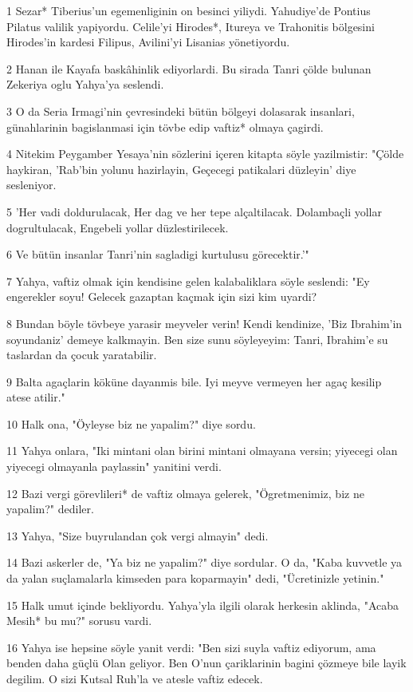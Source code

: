 \par 1 Sezar* Tiberius'un egemenliginin on besinci yiliydi. Yahudiye'de Pontius Pilatus valilik yapiyordu. Celile'yi Hirodes*, Itureya ve Trahonitis bölgesini Hirodes'in kardesi Filipus, Avilini'yi Lisanias yönetiyordu.
\par 2 Hanan ile Kayafa baskâhinlik ediyorlardi. Bu sirada Tanri çölde bulunan Zekeriya oglu Yahya'ya seslendi.
\par 3 O da Seria Irmagi'nin çevresindeki bütün bölgeyi dolasarak insanlari, günahlarinin bagislanmasi için tövbe edip vaftiz* olmaya çagirdi.
\par 4 Nitekim Peygamber Yesaya'nin sözlerini içeren kitapta söyle yazilmistir: "Çölde haykiran, 'Rab'bin yolunu hazirlayin, Geçecegi patikalari düzleyin' diye sesleniyor.
\par 5 'Her vadi doldurulacak, Her dag ve her tepe alçaltilacak. Dolambaçli yollar dogrultulacak, Engebeli yollar düzlestirilecek.
\par 6 Ve bütün insanlar Tanri'nin sagladigi kurtulusu görecektir.'"
\par 7 Yahya, vaftiz olmak için kendisine gelen kalabaliklara söyle seslendi: "Ey engerekler soyu! Gelecek gazaptan kaçmak için sizi kim uyardi?
\par 8 Bundan böyle tövbeye yarasir meyveler verin! Kendi kendinize, 'Biz Ibrahim'in soyundaniz' demeye kalkmayin. Ben size sunu söyleyeyim: Tanri, Ibrahim'e su taslardan da çocuk yaratabilir.
\par 9 Balta agaçlarin köküne dayanmis bile. Iyi meyve vermeyen her agaç kesilip atese atilir."
\par 10 Halk ona, "Öyleyse biz ne yapalim?" diye sordu.
\par 11 Yahya onlara, "Iki mintani olan birini mintani olmayana versin; yiyecegi olan yiyecegi olmayanla paylassin" yanitini verdi.
\par 12 Bazi vergi görevlileri* de vaftiz olmaya gelerek, "Ögretmenimiz, biz ne yapalim?" dediler.
\par 13 Yahya, "Size buyrulandan çok vergi almayin" dedi.
\par 14 Bazi askerler de, "Ya biz ne yapalim?" diye sordular. O da, "Kaba kuvvetle ya da yalan suçlamalarla kimseden para koparmayin" dedi, "Ücretinizle yetinin."
\par 15 Halk umut içinde bekliyordu. Yahya'yla ilgili olarak herkesin aklinda, "Acaba Mesih* bu mu?" sorusu vardi.
\par 16 Yahya ise hepsine söyle yanit verdi: "Ben sizi suyla vaftiz ediyorum, ama benden daha güçlü Olan geliyor. Ben O'nun çariklarinin bagini çözmeye bile layik degilim. O sizi Kutsal Ruh'la ve atesle vaftiz edecek.
